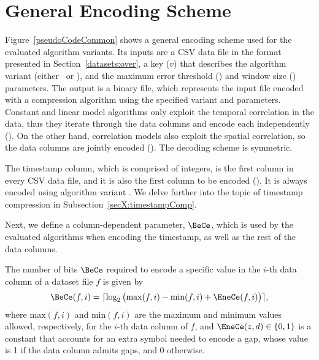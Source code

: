

\vspace{-20pt}
\section{General Encoding Scheme}
\label{algo:details}


\vspace{-5pt}
Figure~\ref{pseudoCodeCommon} shows a general encoding scheme used for the evaluated algorithm variants. Its inputs are a CSV data file in the format presented in Section~\ref{datasets:over}, a key ($v$) that describes the algorithm variant (either \maskalgo\ or \NOmaskalgo), and the maximum error threshold (\maxerror) and window size (\win) parameters. The output is a binary file, which represents the input file encoded with a compression algorithm using the specified variant and parameters. Constant and linear model algorithms only exploit the temporal correlation in the data, thus they iterate through the data columns and encode each independently (). On the other hand, correlation models also exploit the spatial correlation, so the data columns are jointly encoded (). The decoding scheme is symmetric.





\clearpage


The timestamp column, which is comprised of integers, is the first column in every CSV data file, and it is also the first column to be encoded (). It is always encoded using algorithm variant . We delve further into the topic of timestamp compression in Subsection~\ref{secX:timestampComp}. 


Next, we define a column-dependent parameter, $\BeCe$, which is used by the evaluated algorithms when encoding the timestamp, as well as the rest of the data columns.


\begin{defcion}
The number of bits $\BeCe$ required to encode a specific value in the $i$-th data column of a dataset file $f$ is given by
\vspace{-5pt}
\begin{equation}
\label{eq:bece}
\BeCe(f, i) = \lceil{ \log_2 \big( \text{max}(f, i) - \text{min}(f, i) + \EneCe(f, i) \big) } \rceil,
\end{equation}
where $\text{max}(f, i)$ and $\text{min}(f, i)$ are the maximum and minimum values allowed, respectively, for the $i$-th data column of $f$, and $\EneCe(z, d)\in \{0,1\}$ is a constant that accounts for an extra symbol needed to encode a gap, whose value is 1 if the data column admits gaps, and 0 otherwise.
\end{defcion}


